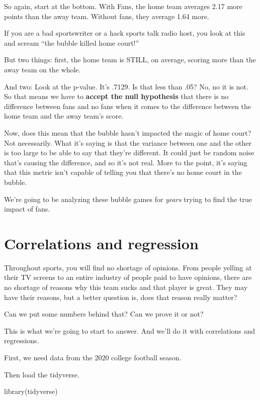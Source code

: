 \documentclass[
  letterpaper,
  DIV=11,
  numbers=noendperiod]{scrreprt}
\newenvironment{Shaded}{\begin{snugshade}}{\end{snugshade}}
\newcommand{\FunctionTok}[1]{\textcolor[rgb]{0.28,0.35,0.67}{#1}}
\newcommand{\NormalTok}[1]{\textcolor[rgb]{0.00,0.23,0.31}{#1}}
\begin{document}
So again, start at the bottom. With Fans, the home team averages 2.17
more points than the away team. Without fans, they average 1.64 more.

If you are a bad sportswriter or a hack sports talk radio host, you look
at this and scream ``the bubble killed home court!''

But two things: first, the home team is STILL, on average, scoring more
than the away team on the whole.

And two: Look at the p-value. It's .7129. Is that less than .05? No, no
it is not. So that means we have to \textbf{accept the null hypothesis}
that there is no difference between fans and no fans when it comes to
the difference between the home team and the away team's score.

Now, does this mean that the bubble hasn't impacted the magic of home
court? Not necessarily. What it's saying is that the variance between
one and the other is too large to be able to say that they're different.
It could just be random noise that's causing the difference, and so it's
not real. More to the point, it's saying that this metric isn't capable
of telling you that there's no home court in the bubble.

We're going to be analyzing these bubble games for \emph{years} trying
to find the true impact of fans.


\hypertarget{correlations-and-regression}{%
\chapter{Correlations and
regression}\label{correlations-and-regression}}

Throughout sports, you will find no shortage of opinions. From people
yelling at their TV screens to an entire industry of people paid to have
opinions, there are no shortage of reasons why this team sucks and that
player is great. They may have their reasons, but a better question is,
does that reason really matter?

Can we put some numbers behind that? Can we prove it or not?

This is what we're going to start to answer. And we'll do it with
correlations and regressions.

First, we need data from the 2020 college football season.

Then load the tidyverse.

\begin{Shaded}
\begin{Highlighting}[]
\FunctionTok{library}\NormalTok{(tidyverse)}
\end{Highlighting}
\end{Shaded}
\end{document}
